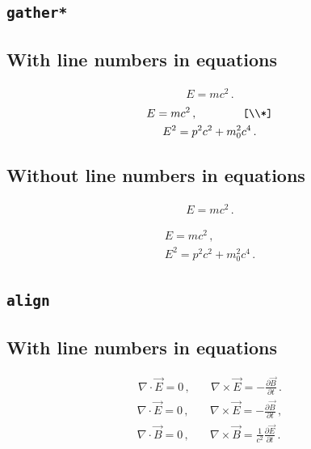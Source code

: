 \subsection*{\texttt{gather*}}

\subsection*{With line numbers in equations}
\nextlipsum
\begin{gather*}
  E = m c^2 \,.
\end{gather*}
\nextlipsum
\begin{gather*}
  E = m c^2 \,, \qquad\qquad\texttt{[\textbackslash\textbackslash{}*]}\\*
  E^2 = p^2 c^2 + m_0^2 c^4 \,.
\end{gather*}
\nextlipsum

\subsection*{Without line numbers in equations}
\nextlipsum
\begin{linenomath*}
\begin{gather*}
  E = m c^2 \,.
\end{gather*}
\end{linenomath*}
\nextlipsum
\begin{linenomath*}
\begin{gather*}
  E = m c^2 \,, \\
  E^2 = p^2 c^2 + m_0^2 c^4 \,.
\end{gather*}
\end{linenomath*}
\nextlipsum

\subsection*{\texttt{align}}

\subsection*{With line numbers in equations}
\nextlipsum
\begin{align}
  \nabla \cdot \vec E = 0 \,, &\quad \nabla \times \vec E = - \frac{\partial \vec B}{\partial t} \,.
\end{align}
\nextlipsum
\begin{align}
  \nabla \cdot \vec E = 0 \,, &\quad \nabla \times \vec E = - \frac{\partial \vec B}{\partial t} \,, \\
  \nabla \cdot \vec B = 0 \,, &\quad \nabla \times \vec B = \frac{1}{c^2} \frac{\partial \vec E}{\partial t} \,.
\end{align}
\nextlipsum

